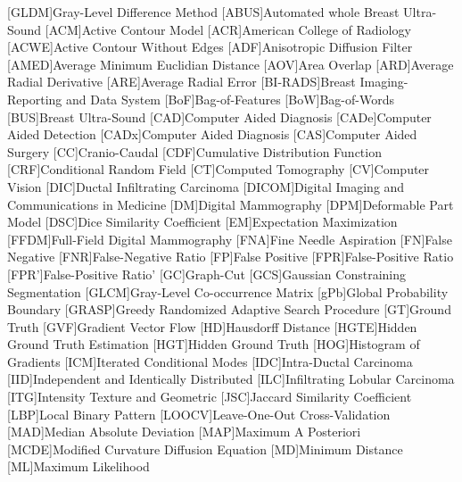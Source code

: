 \begin{acronym}
[GLDM]{Gray-Level Difference Method}
[ABUS]{Automated whole Breast Ultra-Sound}
[ACM]{Active Contour Model}
[ACR]{American College of Radiology}
[ACWE]{Active Contour Without Edges}
[ADF]{Anisotropic Diffusion Filter}
[AMED]{Average Minimum Euclidian Distance}
[AOV]{Area Overlap}
[ARD]{Average Radial Derivative}
[ARE]{Average Radial Error}
[BI-RADS]{Breast Imaging-Reporting and Data System}
[BoF]{Bag-of-Features}
[BoW]{Bag-of-Words}
[BUS]{Breast Ultra-Sound}
[CAD]{Computer Aided Diagnosis}
[CADe]{Computer Aided Detection}
[CADx]{Computer Aided Diagnosis}
[CAS]{Computer Aided Surgery}
[CC]{Cranio-Caudal}
[CDF]{Cumulative Distribution Function}
[CRF]{Conditional Random Field}
[CT]{Computed Tomography}
[CV]{Computer Vision}
[DIC]{Ductal Infiltrating Carcinoma}
[DICOM]{Digital Imaging and Communications in Medicine}
[DM]{Digital Mammography}
[DPM]{Deformable Part Model}
[DSC]{Dice Similarity Coefficient}
[EM]{Expectation Maximization}
[FFDM]{Full-Field Digital Mammography}
[FNA]{Fine Needle Aspiration}
[FN]{False Negative}
[FNR]{False-Negative Ratio}
[FP]{False Positive}
[FPR]{False-Positive Ratio}
[FPR']{False-Positive Ratio'}
[GC]{Graph-Cut}
[GCS]{Gaussian Constraining Segmentation}
[GLCM]{Gray-Level Co-occurrence Matrix}
[gPb]{Global Probability Boundary}
[GRASP]{Greedy Randomized Adaptive Search Procedure}
[GT]{Ground Truth}
[GVF]{Gradient Vector Flow}
[HD]{Hausdorff Distance}
[HGTE]{Hidden Ground Truth Estimation}
[HGT]{Hidden Ground Truth}
[HOG]{Histogram of Gradients}
[ICM]{Iterated Conditional Modes}
[IDC]{Intra-Ductal Carcinoma}
[IID]{Independent and Identically Distributed}
[ILC]{Infiltrating Lobular Carcinoma}
[ITG]{Intensity Texture and Geometric}
[JSC]{Jaccard Similarity Coefficient}
[LBP]{Local Binary Pattern}
[LOOCV]{Leave-One-Out Cross-Validation} 
[MAD]{Median Absolute Deviation}
[MAP]{Maximum A Posteriori}
[MCDE]{Modified Curvature Diffusion Equation}
[MD]{Minimum Distance}
[ML]{Maximum Likelihood}

\end{acronym}
